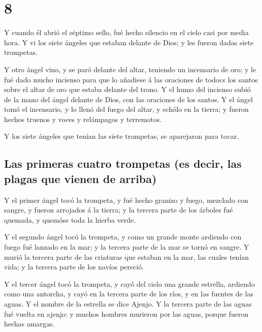\hypertarget{section-7}{%
\section{8}\label{section-7}}

 Y cuando él abrió el séptimo sello, fué hecho silencio en
el cielo casi por media hora.  Y vi los siete ángeles que
estaban delante de Dios; y les fueron dadas siete trompetas.

 Y otro ángel vino, y se paró delante del altar, teniendo un
incensario de oro; y le fué dado mucho incienso para que lo añadiese á
las oraciones de todocs los santos sobre el altar de oro que estaba
delante del trono.  Y el humo del incienso subió de la mano
del ángel delante de Dios, con las oraciones de los santos. 
Y el ángel tomó el incensario, y lo llenó del fuego del altar, y echólo
en la tierra; y fueron hechos truenos y voces y relámpagos y terremotos.

 Y los siete ángeles que tenían las siete trompetas, se
aparejaron para tocar.

\hypertarget{las-primeras-cuatro-trompetas-es-decir-las-plagas-que-vienen-de-arriba}{%
\subsection{Las primeras cuatro trompetas (es decir, las plagas que
vienen de
arriba)}\label{las-primeras-cuatro-trompetas-es-decir-las-plagas-que-vienen-de-arriba}}

 Y el primer ángel tocó la trompeta, y fué hecho granizo y
fuego, mezclado con sangre, y fueron arrojados á la tierra; y la tercera
parte de los árboles fué quemada, y quemóse toda la hierba verde.

 Y el segundo ángel tocó la trompeta, y como un grande monte
ardiendo con fuego fué lanzado en la mar; y la tercera parte de la mar
se tornó en sangre.  Y murió la tercera parte de las
criaturas que estaban en la mar, las cuales tenían vida; y la tercera
parte de los navíos pereció.

 Y el tercer ángel tocó la trompeta, y cayó del cielo una
grande estrella, ardiendo como una antorcha, y cayó en la tercera parte
de los ríos, y en las fuentes de las aguas.  Y el nombre de
la estrella se dice Ajenjo. Y la tercera parte de las aguas fué vuelta
en ajenjo: y muchos hombres murieron por las aguas, porque fueron hechas
amargas.

